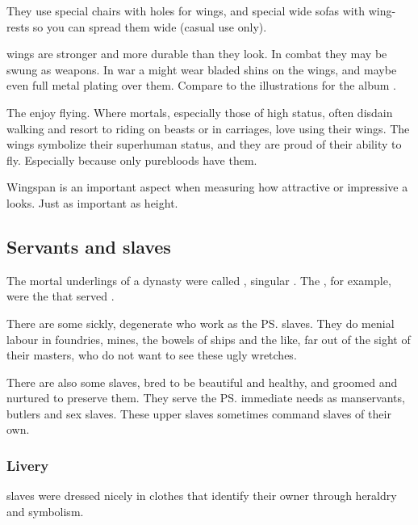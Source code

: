 They use special chairs with holes for wings, and special wide sofas with wing-rests so you can spread them wide (casual use only). 

\Resphan{} wings are stronger and more durable than they look. 
In combat they may be swung as weapons. 
In war a \resphan{} might wear bladed shins on the wings, and maybe even full metal plating over them. 
Compare to the illustrations for the album . 

The \resphain{} enjoy flying. 
Where mortals, especially those of high status, often disdain walking and resort to riding on beasts or in carriages, \resphain{} love using their wings. 
The wings symbolize their superhuman status, and they are proud of their ability to fly. 
Especially because only purebloods have them. 

Wingspan is an important aspect when measuring how attractive or impressive a \resphan{} looks. 
Just as important as height. 









\subsection{Servants and slaves}
The mortal underlings of a \resphan dynasty were called \hedrim, singular \hedor. 
The \hedrim[\Mystraacht], for example, were the \hedrim that served \Mystraacht. 

There are some sickly, degenerate \humans{} who work as the \ps{\resphain}{} slaves. 
They do menial labour in foundries, mines, the bowels of ships and the like, far out of the sight of their masters, who do not want to see these ugly wretches. 

There are also some  slaves, bred to be beautiful and healthy, and groomed and nurtured to preserve them. They serve the \ps{\resphain}{} immediate needs as manservants, butlers and sex slaves. 
These upper slaves sometimes command slaves of their own. 





\subsubsection{Livery}
\CiriathSepher{} slaves were dressed nicely in clothes that identify their owner through heraldry and symbolism. 

